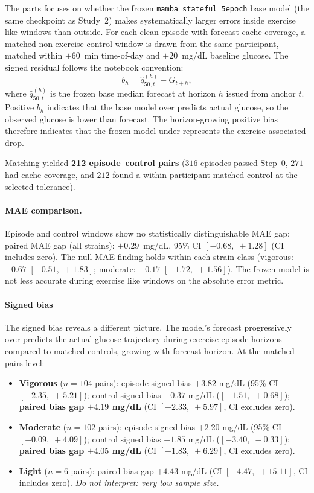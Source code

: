 The parts focuses on whether the frozen \texttt{mamba\_stateful\_5epoch}
base model (the same checkpoint as Study~2) makes systematically larger errors
inside exercise like windows than outside.
For each clean episode with forecast cache coverage, a matched non-exercise
control window is drawn from the same participant, matched within
$\pm 60$~min time-of-day and $\pm 20$~mg/dL baseline glucose.
The signed residual follows the notebook convention:
\begin{equation}
  b_{h} = \hat{q}_{50,t}^{(h)} - G_{t+h},
  \label{eq:signed_residual}
\end{equation}
where $\hat{q}_{50,t}^{(h)}$ is the frozen base median forecast at horizon $h$
issued from anchor $t$.
Positive $b_{h}$ indicates that the base model over predicts actual glucose,
so the observed glucose is lower than forecast.  The horizon-growing positive
bias therefore indicates that the frozen model under represents the
exercise associated drop.

Matching yielded \textbf{212 episode--control pairs}
($316$ episodes passed Step~0, $271$ had cache coverage, and $212$ found a
within-participant matched control at the selected tolerance).

\paragraph{MAE comparison.}
Episode and control windows show no statistically distinguishable MAE gap:
paired MAE gap (all strains): $+0.29$~mg/dL, 95\% CI $[-0.68,\;+1.28]$
(CI includes zero).
The null MAE finding holds within each strain class
(vigorous: $+0.67$ $[-0.51,\;+1.83]$;
moderate: $-0.17$ $[-1.72,\;+1.56]$).
The frozen model is not less accurate during exercise like windows on the
absolute error metric.

\paragraph{Signed bias }
The signed bias reveals a different picture.
The model's forecast progressively over predicts the actual glucose
trajectory during exercise-episode horizons compared to matched controls,
growing with forecast horizon.
At the matched-pairs level:

\begin{itemize}
  \item \textbf{Vigorous} ($n = 104$ pairs):
        episode signed bias $+3.82$ mg/dL (95\% CI $[+2.35,\;+5.21]$);
        control signed bias $-0.37$ mg/dL ($[-1.51,\;+0.68]$);
        \textbf{paired bias gap $+4.19$ mg/dL} (CI $[+2.33,\;+5.97]$,
        CI excludes zero).
  \item \textbf{Moderate} ($n = 102$ pairs):
        episode signed bias $+2.20$ mg/dL (95\% CI $[+0.09,\;+4.09]$);
        control signed bias $-1.85$ mg/dL ($[-3.40,\;-0.33]$);
        \textbf{paired bias gap $+4.05$ mg/dL} (CI $[+1.83,\;+6.29]$,
        CI excludes zero).
  \item \textbf{Light} ($n = 6$ pairs):
        paired bias gap $+4.43$ mg/dL (CI $[-4.47,\;+15.11]$,
        CI includes zero). \emph{Do not interpret: very low sample size.}
\end{itemize}

